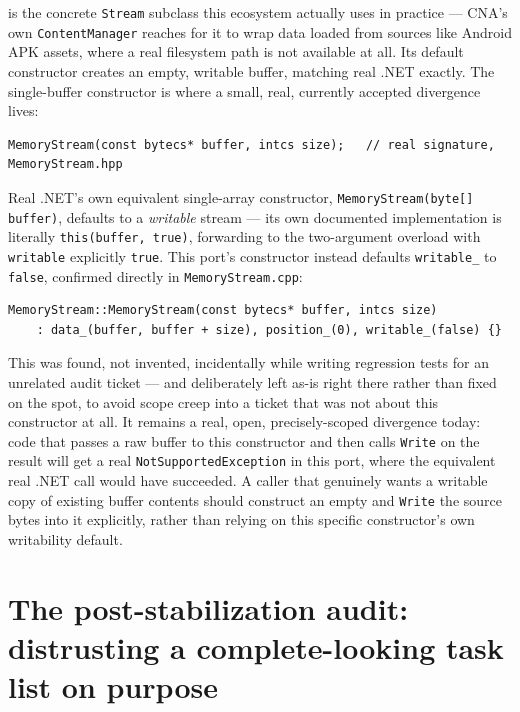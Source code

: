  is the concrete \texttt{Stream} subclass this ecosystem
actually uses in practice --- CNA's own \texttt{ContentManager} reaches for it to wrap data
loaded from sources like Android APK assets, where a real filesystem path is not available at
all. Its default constructor creates an empty, writable buffer, matching real .NET exactly. The
single-buffer constructor is where a small, real, currently accepted divergence lives:

\begin{lstlisting}
MemoryStream(const bytecs* buffer, intcs size);   // real signature, MemoryStream.hpp
\end{lstlisting}

Real .NET's own equivalent single-array constructor, \texttt{MemoryStream(byte[] buffer)},
defaults to a \emph{writable} stream --- its own documented implementation is literally
\texttt{this(buffer, true)}, forwarding to the two-argument overload with \texttt{writable}
explicitly \texttt{true}. This port's constructor instead defaults \texttt{writable\_} to
\texttt{false}, confirmed directly in \texttt{MemoryStream.cpp}:

\begin{lstlisting}
MemoryStream::MemoryStream(const bytecs* buffer, intcs size)
    : data_(buffer, buffer + size), position_(0), writable_(false) {}
\end{lstlisting}

This was found, not invented, incidentally while writing regression tests for an unrelated
audit ticket --- and deliberately left as-is right there rather than fixed on the spot, to
avoid scope creep into a ticket that was not about this constructor at all. It remains a
real, open, precisely-scoped divergence today: code that passes a raw buffer to this
constructor and then calls \texttt{Write} on the result will get a real
\texttt{NotSupportedException} in this port, where the equivalent real .NET call would have
succeeded. A caller that genuinely wants a writable copy of existing buffer contents should
construct an empty  and \texttt{Write} the source bytes into it
explicitly, rather than relying on this specific constructor's own writability default.

\section{The post-stabilization audit: distrusting a complete-looking task list on purpose}

